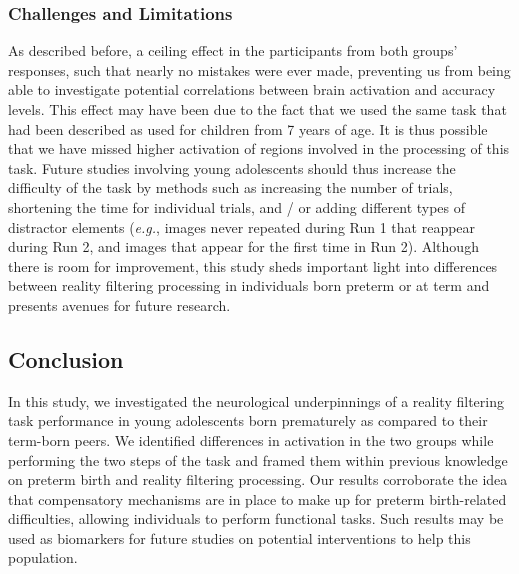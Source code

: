 \subsubsection{Challenges and Limitations} \label{sub:limitations}
 As described before, a ceiling effect in the participants from both groups' responses, such that nearly no mistakes were ever made, preventing us from being able to investigate potential correlations between brain activation and accuracy levels. This effect may have been due to the fact that we used the same task that had been described as used for children from 7 years of age. It is thus possible that we have missed higher activation of regions involved in the processing of this task. Future studies involving young adolescents should thus increase the difficulty of the task by methods such as increasing the number of trials, shortening the time for individual trials, and / or adding different types of distractor elements (\textit{e.g.}, images never repeated during Run 1 that reappear during Run 2, and images that appear for the first time in Run 2). Although there is room for improvement, this study sheds important light into differences between reality filtering processing in individuals born preterm or at term and presents avenues for future research.

\subsection*{Conclusion}
In this study, we investigated the neurological underpinnings of a reality filtering task performance in young adolescents born prematurely as compared to their term-born peers. We identified differences in activation in the two groups while performing the two steps of the task and framed them within previous knowledge on preterm birth and reality filtering processing. Our results corroborate the idea that compensatory mechanisms are in place to make up for preterm birth-related difficulties, allowing individuals to perform functional tasks. Such results may be used as biomarkers for future studies on potential interventions to help this population. 



